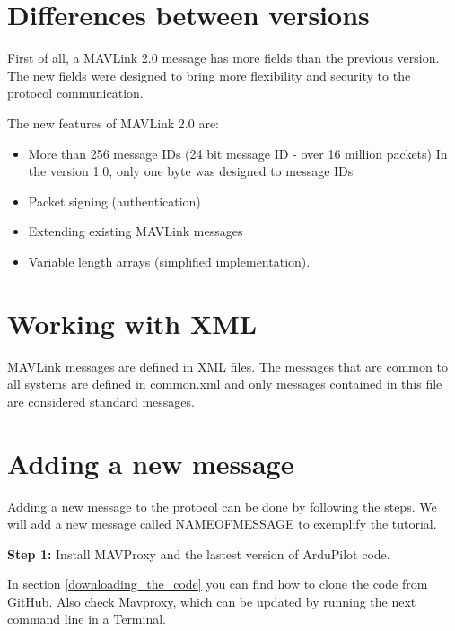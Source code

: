 
\section{Differences between versions}

First of all, a MAVLink 2.0 message has more fields than the previous version. The new fields were designed to bring more flexibility and security to the protocol communication.

The new features of MAVLink 2.0 are:
\begin{itemize}
\item More than 256 message IDs (24 bit message ID - over 16 million packets)
	In the version 1.0, only one byte was designed to message IDs  
\item Packet signing (authentication)
\item Extending existing MAVLink messages
\item Variable length arrays (simplified implementation).
\end{itemize}


\section{Working with XML}
MAVLink messages are defined in XML files. The messages that are common to all systems are defined in common.xml and only messages contained in this file are considered standard messages. 

\section{Adding a new message}


Adding a new message to the protocol can be done by following the steps. We will add a new message called NAMEOFMESSAGE to exemplify the tutorial.

\textbf{Step 1:} Install MAVProxy and the lastest version of ArduPilot code.

In section \ref{downloading_the_code} you can find how to clone the code from GitHub. Also check Mavproxy, which can be updated by running the next command line in a Terminal.

